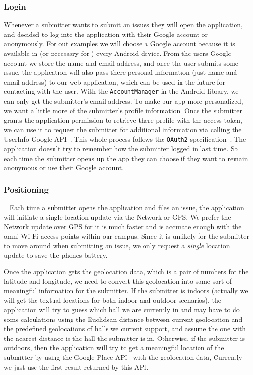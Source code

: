 \documentclass{acm_proc_article-sp}
\begin{document}
 \subsubsection{Login}
 Whenever a submitter wants to submit an issues they will open the application, and decided to log into the application with their Google account or anonymously.
 For out examples we will choose a Google account because it is available in (or necessary for ) every Android device. From the users Google account we store the 
 name and email address, and once the user submits some issue, the application will also pass there personal information (just name and email address)
 to our web application, which can be used in the future for contacting with the user. With the \texttt{AccountManager} in the Android library, we
 can only get the submitter's email address. To make our app more personalized, we want a little more of the submitter's profile information.
 Once the submitter grants the application permission to retrieve there profile with the access token,
 we can use it to request the submitter for additional information via calling the UserInfo Google API~\cite{google-user-api}.
 This whole process follows the \texttt{OAuth2} specification~\cite{oauth2}.
 The application doesn't try to remember how the submitter logged in last time.
 So each time the submitter opens up the app they can choose if they want to remain anonymous or use their Google account.

\subsubsection{Positioning}~\label{sec:position}
 Each time a submitter opens the application and files an issue, the application will initiate a single location update via the 
 Network or GPS. We prefer the Network update over GPS for it is much faster and is accurate enough with the omni Wi-Fi access points within our campus.
 Since it is unlikely for the submitter to move around when submitting an issue, we only request a \textit{single} location update 
 to save the phones battery. \framedots
 
 Once the application gets the geolocation data, which is a pair of numbers for the latitude and longitude, 
 we need to convert this geolocation into some sort of meaningful information for the submitter.
 If the submitter is indoors (actually we will get the textual locations for both indoor and outdoor scenarios), 
 the application will try to guess which hall we are currently in and may have to do some calculations using the Euclidean distance between current geolocation 
 and the predefined geolocations of halls we current support, and assume the one with the nearest distance is the hall the submitter is in. 
 Otherwise, if the submitter is outdoors, then the application will try to get a meaningful location of the submitter by using 
 the Google Place API~\cite{google-place-api} with the geolocation data, Currently we just use the first result returned by this API.
 
\end{document}
